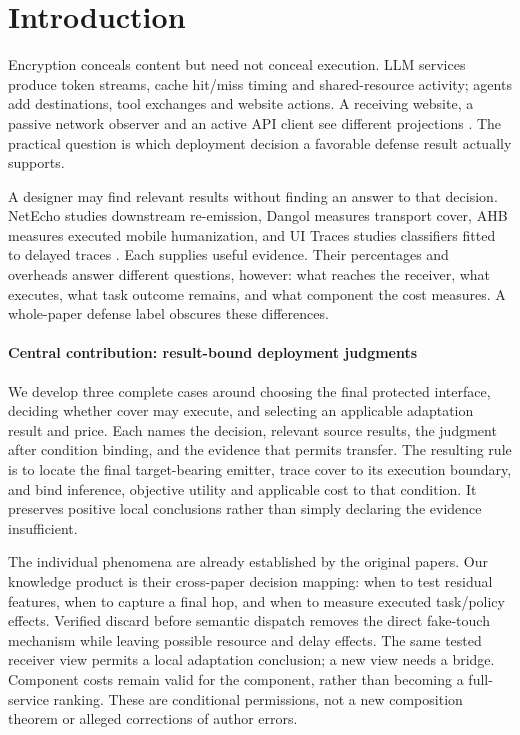 \section{Introduction}\label{sec:introduction}
Encryption conceals content but need not conceal execution. LLM services produce token streams, cache hit/miss timing and shared-resource activity; agents add destinations, tool exchanges and website actions. A receiving website, a passive network observer and an active API client see different projections \cite{weiss2024prompt,promptpeek2025,earlybird2025,agentprint2025,uitraces2026,jeong2026wra}. The practical question is which deployment decision a favorable defense result actually supports.

A designer may find relevant results without finding an answer to that decision. NetEcho studies downstream re-emission, Dangol measures transport cover, AHB measures executed mobile humanization, and UI Traces studies classifiers fitted to delayed traces \cite{netecho2025,dangol2026workflow,zhu2026turing,uitraces2026}. Each supplies useful evidence. Their percentages and overheads answer different questions, however: what reaches the receiver, what executes, what task outcome remains, and what component the cost measures. A whole-paper defense label obscures these differences.

\paragraph{Central contribution: result-bound deployment judgments}
We develop three complete cases around choosing the final protected interface, deciding whether cover may execute, and selecting an applicable adaptation result and price. Each names the decision, relevant source results, the judgment after condition binding, and the evidence that permits transfer. The resulting rule is to locate the final target-bearing emitter, trace cover to its execution boundary, and bind inference, objective utility and applicable cost to that condition. It preserves positive local conclusions rather than simply declaring the evidence insufficient.

The individual phenomena are already established by the original papers. Our knowledge product is their cross-paper decision mapping: when to test residual features, when to capture a final hop, and when to measure executed task/policy effects. Verified discard before semantic dispatch removes the direct fake-touch mechanism while leaving possible resource and delay effects. The same tested receiver view permits a local adaptation conclusion; a new view needs a bridge. Component costs remain valid for the component, rather than becoming a full-service ranking. These are conditional permissions, not a new composition theorem or alleged corrections of author errors.

